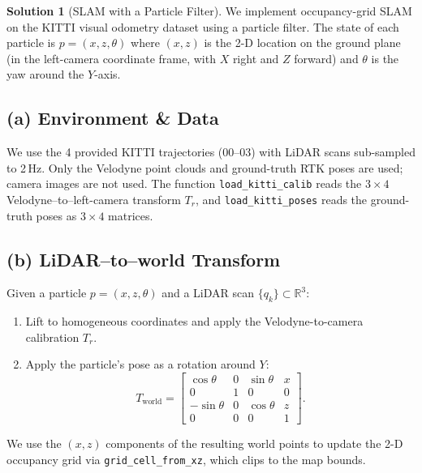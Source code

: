 \documentclass[11pt, reqno, letterpaper, twoside]{amsart}
\theoremstyle{plain}
\theoremstyle{definition}
\newtheorem{solution}[theorem]{Solution}
\begin{document}
\clearpage
\begin{solution}[SLAM with a Particle Filter]

We implement occupancy-grid SLAM on the KITTI visual odometry dataset using a particle filter.  The state of each particle is $p = (x, z, \theta)$ where $(x, z)$ is the 2-D location on the ground plane (in the left-camera coordinate frame, with $X$ right and $Z$ forward) and $\theta$ is the yaw around the $Y$-axis.

\subsection*{(a) Environment \& Data}

We use the 4 provided KITTI trajectories (00--03) with LiDAR scans sub-sampled to 2\,Hz.  Only the Velodyne point clouds and ground-truth RTK poses are used; camera images are not used.  The function \texttt{load\_kitti\_calib} reads the $3\times 4$ Velodyne--to--left-camera transform $T_r$, and \texttt{load\_kitti\_poses} reads the ground-truth poses as $3\times 4$ matrices.

\subsection*{(b) LiDAR--to--world Transform}

Given a particle $p = (x, z, \theta)$ and a LiDAR scan $\{q_k\}\subset\mathbb{R}^3$:
\begin{enumerate}
  \item Lift to homogeneous coordinates and apply the Velodyne-to-camera calibration $T_r$.
  \item Apply the particle's pose as a rotation around $Y$:
  \[
    T_{\text{world}} =
    \begin{bmatrix}
      \cos\theta & 0 & \sin\theta & x \\
      0 & 1 & 0 & 0 \\
      -\sin\theta & 0 & \cos\theta & z \\
      0 & 0 & 0 & 1
    \end{bmatrix}.
  \]
\end{enumerate}
We use the $(x, z)$ components of the resulting world points to update the 2-D occupancy grid via \texttt{grid\_cell\_from\_xz}, which clips to the map bounds.


\end{solution}
\end{document}
